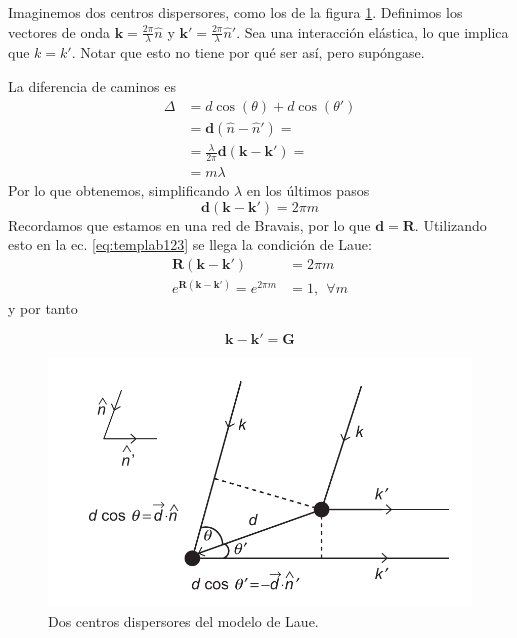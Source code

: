 Imaginemos dos centros dispersores, como los de la figura \ref{fig:laue_geom}.
Definimos los vectores de onda $ \mathbf{k}=\frac{2\pi}{\lambda} \hat n$ y $
\mathbf{k'}=\frac{2\pi}{\lambda} \hat n'$. Sea una interacción elástica, lo que
implica que $k=k'$. Notar que esto no tiene por qué ser así, pero supóngase.

La diferencia de caminos es 
\begin{equation}
\begin{split}
  \Delta &= d \cos(\theta) + d \cos(\theta') \\
         &= \mathbf{d} (\hat n - \hat n ') = \\
         &= \frac{\lambda}{2\pi} \mathbf{d} (\mathbf{k}-\mathbf{k}')= \\
         &= m\lambda
\end{split}
\end{equation}
Por lo que obtenemos, simplificando $\lambda$ en los últimos pasos
\begin{equation}
  \mathbf{d}(\mathbf{k}-\mathbf{k}') = 2\pi m
  \label{eq:templab123}
\end{equation}
Recordamos que estamos en una red de Bravais, por lo que
$\mathbf{d}=\mathbf{R}$. Utilizando esto en la ec. \ref{eq:templab123} se llega
la condición de Laue:
\begin{equation}
\begin{split}
  \mathbf{R}(\mathbf{k}-\mathbf{k}') &= 2\pi m \\
  e ^{\mathbf{R}(\mathbf{k}-\mathbf{k}')} = e ^{2\pi m} &= 1, \ \ \forall m
\end{split}
\end{equation}
y por tanto

\begin{equation}
  \label{eq:lauecond}
\mathbf{k}-\mathbf{k'} = \mathbf{G}
\end{equation}

\begin{figure}
  \centering
  \includegraphics[width=\textwidth]{figures/laue_geom.png}
  \caption{Dos centros dispersores del modelo de Laue.}
  \label{fig:laue_geom}
\end{figure}

